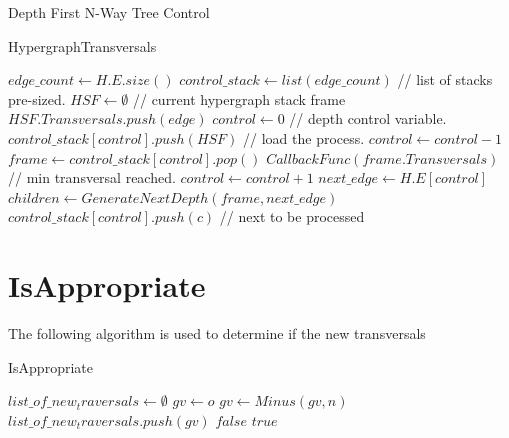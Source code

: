 \newpage

Depth First N-Way Tree Control

\begin{algorithm}
	\caption{HypergraphTransversals}\label{HypergraphTransversals}
	\begin{algorithmic}[1]
		\State $edge\_count \gets H.E.size()$
		\State $control\_stack \gets list(edge\_count)$ // list of stacks pre-sized.
		\State $HSF \gets \emptyset $ // current hypergraph stack frame
		\State $HSF.Transversals.push(edge)$
		\State $control \gets 0$ // depth control variable.
		\State $control\_stack[control].push(HSF)$ // load the process.
		\State $control \gets control-1$
		\Else
		\State $frame \gets control\_stack[control].pop()$
		\State $CallbackFunc(frame.Transversals)$ // min transversal reached.
		\Else
		\State $control \gets control +1$
		\State $next\_edge \gets H.E[control]$
		\State $children \gets GenerateNextDepth(frame,next\_edge)$
		\State $control\_stack[control].push(c)$ // next to be processed
		\EndFor 
		\EndIf
		\EndIf
		\EndWhile
		\EndFunction
	\end{algorithmic}
\end{algorithm}


\newpage

\section{IsAppropriate}

The following algorithm is used to determine if the new transversals 

\begin{algorithm}
	\caption{IsAppropriate}\label{IsAppropriate}
	\begin{algorithmic}[1]
		\State $list\_of\_new_traversals \gets \emptyset$
		\State $gv \gets o$
		\State $gv \gets Minus(gv,n)$
		\EndIf
		\EndFor
		\State $list\_of\_new_traversals.push(gv)$
		\EndIf
		\EndFor
		\State \Return $false$
		\EndIf
		\State \Return $true$
		\EndFunction
	\end{algorithmic}
\end{algorithm}